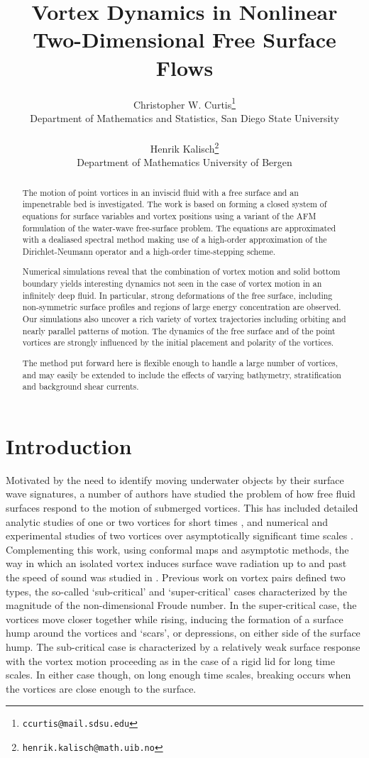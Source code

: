 \documentclass[a4paper,11pt]{article}
\title{Vortex Dynamics in Nonlinear Two-Dimensional Free Surface Flows}
\author{Christopher W. Curtis\footnote{\texttt{ccurtis@mail.sdsu.edu}} \\
{\small Department of Mathematics and Statistics, San Diego State University} 
\\\\
Henrik Kalisch\footnote{\texttt{henrik.kalisch@math.uib.no}}
\\ {\small Department of Mathematics University of Bergen} 
}
\date{}
\begin{document}
\maketitle

\begin{abstract}
The motion of point vortices in an inviscid fluid with a free surface and an impenetrable bed is investigated.
The work is based on forming a closed system of equations for surface variables and vortex positions 
using a variant of the AFM formulation \cite{afm} of the water-wave free-surface problem. 
The equations are approximated with a dealiased spectral method 
making use of a high-order approximation of the Dirichlet-Neumann operator
and a high-order time-stepping scheme. 

Numerical simulations reveal that the combination of vortex motion and solid bottom boundary
yields interesting dynamics not seen in the case of vortex motion in an infinitely deep fluid.
In particular, strong deformations of the free surface,
including non-symmetric surface profiles and regions of large energy concentration are observed.
Our simulations also uncover a rich variety of vortex trajectories including
orbiting and nearly parallel patterns of motion.
The dynamics of the free surface and of the point vortices
are strongly influenced by the initial placement and polarity of the vortices.

The method put forward here is flexible enough to handle a large number of vortices,
and may easily be extended to include the effects of varying bathymetry, 
stratification and background shear currents.
\end{abstract}


\section{Introduction}
Motivated by the need to identify moving underwater objects by their surface wave signatures, a number of authors have studied the problem of how free fluid surfaces respond to the motion of submerged vortices.  This has included detailed analytic studies of one or two vortices for short times \cite{tyvand1,tyvand2}, and numerical and experimental studies of two vortices over asymptotically significant time scales \cite{fish,marcus,telste,tryggvason}.  Complementing this work, using conformal maps and asymptotic methods, the way in which an isolated vortex induces surface wave radiation up to and past the speed of sound was studied  in \cite{ruban}.  Previous work on vortex pairs defined two types, the so-called `sub-critical' and `super-critical' cases characterized by the magnitude of the non-dimensional Froude number.  In the super-critical case, the vortices move closer together while rising, inducing the formation of a surface hump around the vortices and `scars', or depressions, on either side of the surface hump.  The sub-critical case is characterized by a relatively weak surface response with the vortex motion proceeding as in the case of a rigid lid for long time scales.  In either case though, on long enough time scales, breaking occurs when the vortices are close enough to the surface.  
\end{document}
